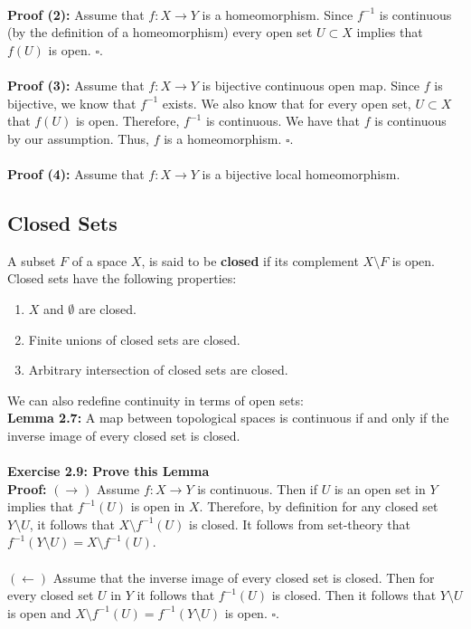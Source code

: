 \documentclass{article}
\begin{document}
\\
\textbf{Proof (2):} Assume that $f:X\to Y$ is a homeomorphism. Since $f^{-1}$ is continuous (by the definition of a homeomorphism) every open set $U\subset X$ implies that $f(U)$ is open. $\square$.\\
\\
\textbf{Proof (3):} Assume that $f:X\to Y$ is bijective continuous open map. Since $f$ is bijective, we know that $f^{-1}$ exists. We also know that for every open set, $U\subset X$ that $f(U)$ is open. Therefore, $f^{-1}$ is continuous. We have that $f$ is continuous by our assumption. Thus, $f$ is a homeomorphism. $\square$.\\
\\
\textbf{Proof (4):} Assume that $f:X\to Y$ is a bijective local homeomorphism.

\subsection{Closed Sets}
A subset $F$ of a space $X$, is said to be \textbf{closed} if its complement $X\setminus F$ is open. Closed sets have the following properties:
\begin{enumerate}
    \item $X$ and $\emptyset$ are closed.
    \item Finite unions of closed sets are closed.
    \item Arbitrary intersection of closed sets are closed.
\end{enumerate}
We can also redefine continuity in terms of open sets:\\
\textbf{Lemma 2.7:} A map between topological spaces is continuous if and only if the inverse image of every closed set is closed.\\
\\
\textbf{Exercise 2.9: Prove this Lemma}\\
\textbf{Proof:} $(\to)$ Assume $f:X\to Y$ is continuous. Then if $U$ is an open set in $Y$ implies that $f^{-1}(U)$ is open in $X$. Therefore, by definition for any closed set $Y\setminus U$, it follows that $X\setminus f^{-1}(U)$ is closed. It follows from set-theory that $f^{-1}(Y\setminus U)=X\setminus f^{-1}(U)$.\\
\\
$(\leftarrow)$ Assume that the inverse image of every closed set is closed. Then for every closed set $U$ in $Y$ it follows that $f^{-1}(U)$ is closed. Then it follows that $Y\setminus U$ is open and $X\setminus f^{-1}(U)=f^{-1}(Y\setminus U)$ is open. $\square$.\\
\end{document}
